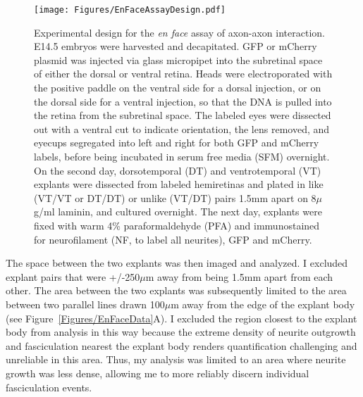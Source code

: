 \begin{figure}[hbtp]
    \begin{center}
        \texttt{[image: Figures/EnFaceAssayDesign.pdf]}
        \caption[Experimental design for the \emph{en face} assay of axon-axon interaction.]
        {Experimental design for the \emph{en face} assay of axon-axon interaction.
		E14.5 embryos were harvested and decapitated.
		GFP or mCherry plasmid was injected via glass micropipet into the subretinal space of either the dorsal or ventral retina.
		Heads were electroporated with the positive paddle on the ventral side for a dorsal injection, or on the dorsal side for a ventral injection, so that the DNA is pulled into the retina from the subretinal space.
		The labeled eyes were dissected out with a ventral cut to indicate orientation, the lens removed, and eyecups segregated into left and right for both GFP and mCherry labels, before being incubated in serum free media (SFM) overnight.
		On the second day, dorsotemporal (DT) and ventrotemporal (VT) explants were dissected from labeled hemiretinas and plated in like (VT/VT or DT/DT) or unlike (VT/DT) pairs 1.5mm apart on 8$\mu$g/ml laminin, and cultured overnight.
		The next day, explants were fixed with warm 4\% paraformaldehyde (PFA) and immunostained for neurofilament (NF, to label all neurites), GFP and mCherry.
		}
        \label{Figures/EnFaceAssayDesign}
    \end{center}
\end{figure}
The space between the two explants was then imaged and analyzed.
I excluded explant pairs that were +/-250$\mu$m away from being 1.5mm apart from each other.
The area between the two explants was subsequently limited to the area between two parallel lines drawn 100$\mu$m away from the edge of the explant body (see Figure~\ref{Figures/EnFaceData}A).
I excluded the region closest to the explant body from analysis in this way because the extreme density of neurite outgrowth and fasciculation nearest the explant body renders quantification challenging and unreliable in this area.
Thus, my analysis was limited to an area where neurite growth was less dense, allowing me to more reliably discern individual fasciculation events.

